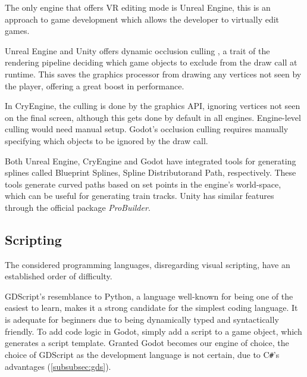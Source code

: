 The only engine that offers VR editing mode is Unreal Engine, this is an approach to game development which allows the developer to virtually edit games. \cite{Unreal_VR_mode}

Unreal Engine and Unity offers dynamic occlusion culling \footnotemark[1] \footnotemark[2], a trait of the rendering pipeline deciding which game objects to exclude from the draw call at runtime. This saves the graphics processor from drawing any vertices not seen by the player, offering a great boost in performance.


In CryEngine, the culling is done by the graphics API, ignoring vertices not seen on the final screen, although this gets done by default in all engines. Engine-level culling would need manual setup. Godot's occlusion culling requires manually specifying which objects to be ignored by the draw call. 

Both Unreal Engine, CryEngine and Godot have integrated tools for generating splines called Blueprint Splines\footnotemark[4], Spline Distributor\footnotemark[5] and Path\footnotemark[6], respectively. These tools generate curved paths based on set points in the engine's world-space, which can be useful for generating train tracks. Unity has similar features through the official package \textit{ProBuilder}.


\subsection{Scripting}
The considered programming languages, disregarding visual scripting, have an established order of difficulty. 

GDScript's resemblance to Python, a language well-known for being one of the easiest to learn, makes it a strong candidate for the simplest coding language. It is adequate for beginners due to being dynamically typed and syntactically friendly. To add code logic in Godot, simply add a script to a game object, which generates a script template. Granted Godot becomes our engine of choice, the choice of GDScript as the development language is not certain, due to  C\texttt{\#}'s advantages (\ref{subsubsec:gds}). 

